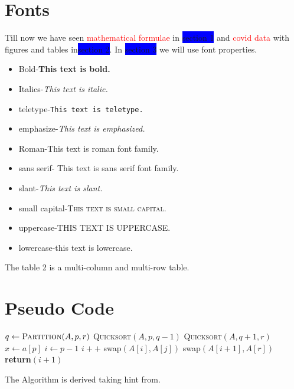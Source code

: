 \documentclass{article}
\begin{document}
\section{Fonts}
Till now we have seen \textcolor{red}{mathematical formulae} in \colorbox{blue}{section 1} and \textcolor{red}{covid data} with figures and tables in\colorbox{blue} {section 2}. In \colorbox{blue}{section 3} we will use font properties.
\begin{itemize}
\item Bold-\textbf{This text is bold.}
\item Italics-\textit{This text is italic.}
\item teletype-\texttt{This text is teletype.}
\item emphasize-\emph{This text is emphasized.}
\item Roman-\textrm{This text is roman font family.}
\item sans serif- \textsf{This text is sans serif font family.}
\item slant-\textsl{This text is slant.}
\item small capital-\textsc{This text is small capital.}
\item uppercase-\uppercase{This text is uppercase.}
\item lowercase-\lowercase{This text is lowercase.}
\end{itemize}\par
The table 2 is a multi-column and multi-row table.
\newpage
\pagecolor{white}
\section{Pseudo Code}
\begin{algorithmic}
\State$q\gets \textsc{Partition}(A,p,r)$
\State \textsc{Quicksort}$(A ,p ,q-1)$
\State \textsc{Quicksort}$(A ,q+1 ,r)$
\EndIf
\EndFunction
{} $x \gets a[p]$ $i \gets p - 1$
\State$i++$
\State swap$(A[i],A[j])$
\EndIf
\EndFor
\State swap$(A[i+1],A[r])$
\State \bf{return}$(i+1)$
\EndFunction
\end{algorithmic}
The Algorithm is derived taking hint from\cite{hoare1962quicksort}.
\newpage


\end{document}
